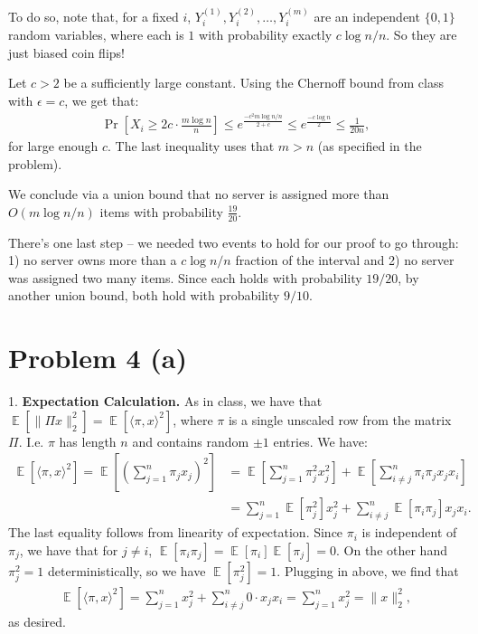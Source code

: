 \documentclass[11pt]{article}
\DeclareMathOperator*{\E}{\mathbb{E}}
\begin{document}
	To do so, note that, for a fixed $i$,  $Y_i^{(1)}, Y_i^{(2)}, \ldots, Y_i^{(m)}$ are an independent $\{0,1\}$ random variables, where each is $1$ with probability exactly $c\log n / n$. So they are just biased coin flips!
	
	Let $c > 2$ be a sufficiently large constant. Using the Chernoff bound from class with $\epsilon = c$, we get that:
	\begin{align*}
		\Pr[X_i \geq 2c \cdot \frac{m\log n}{n}] \leq e^{\frac{-c^2m\log n / n}{2+c}} \leq e^{\frac{-c\log n}{2}} \leq \frac{1}{20n}, 
	\end{align*}
	for large enough $c$. The last inequality uses that $m > n$ (as specified in the problem).
	
	We conclude via a union bound that no server is assigned more than $O(m\log n /n)$ items with probability $\frac{19}{20}$. 
	
	There's one last step -- we needed two events to hold for our proof to go through: 1) no server owns more than a $c\log n / n$ fraction of the interval and 2) no server was assigned two many items. Since each holds with probability $19/20$, by another union bound, both hold with probability $9/10$.
	

	
\section*{Problem 4 (a)}

1. \textbf{Expectation Calculation.} As in class, we have that $\E[\|\Pi x\|_2^2] =  \E[\langle \pi, x\rangle^2]$, where $\pi$ is a single unscaled row from the matrix $\Pi$. I.e. $\pi$ has length $n$ and contains random $\pm 1$ entries. We have:
\begin{align*}
	\E[\langle \pi, x\rangle^2] = \E\left[\left(\sum_{j=1}^n \pi_j x_j \right)^2\right] &= \E\left[\sum_{j=1}^n \pi_j^2 x_j^2\right] + \E\left[\sum_{i\neq j}^n \pi_i\pi_j x_jx_i \right]\\
	&= \sum_{j=1}^n \E\left[\pi_j^2 \right] x_j^2 +\sum_{i\neq j}^n  \E\left[\pi_i\pi_j\right] x_jx_i .
\end{align*}
The last equality follows from linearity of expectation. Since $\pi_i$ is independent of $\pi_j$, we have that for $j\neq i$, $\E\left[\pi_i\pi_j\right] = \E[\pi_i]\E[\pi_j] = 0$. On the other hand $\pi_j^2 = 1$ deterministically, so we have $\E\left[\pi_j^2 \right]  = 1$. Plugging in above, we find that 
\begin{align*}
	\E[\langle \pi, x\rangle^2] = \sum_{j=1}^n x_j^2 +\sum_{i\neq j}^n  0\cdot x_jx_i  =  \sum_{j=1}^n x_j^2 = \|x\|_2^2,
\end{align*}
as desired.
\end{document}
